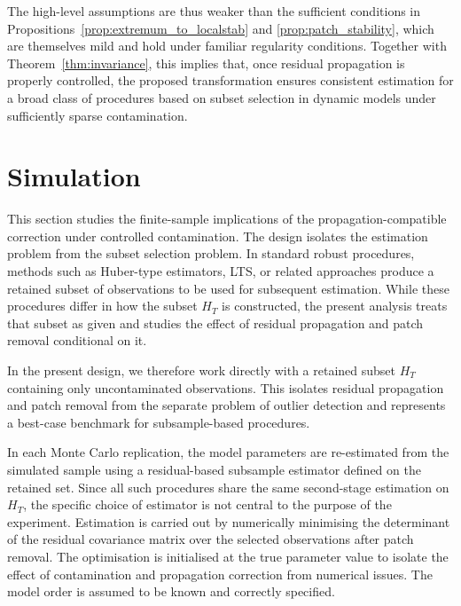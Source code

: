 \documentclass[12pt]{article}
\numberwithin{equation}{section}
\begin{document}
The high-level assumptions are thus weaker than the sufficient conditions in Propositions~\ref{prop:extremum_to_localstab} and \ref{prop:patch_stability}, which are themselves mild and hold under familiar regularity conditions. 
Together with Theorem~\ref{thm:invariance}, this implies that, once residual propagation is properly controlled, the proposed transformation ensures consistent estimation for a broad class of procedures based on subset selection in dynamic models under sufficiently sparse contamination.


\section{Simulation}\label{sec:simulation}

This section studies the finite-sample implications of the propagation-compatible correction under controlled contamination. 
The design isolates the estimation problem from the subset selection problem. 
In standard robust procedures, methods such as Huber-type estimators, LTS, or related approaches produce a retained subset of observations to be used for subsequent estimation. 
While these procedures differ in how the subset $H_T$ is constructed, the present analysis treats that subset as given and studies the effect of residual propagation and patch removal conditional on it.

In the present design, we therefore work directly with a retained subset $H_T$ containing only uncontaminated observations. 
This isolates residual propagation and patch removal from the separate problem of outlier detection and represents a best-case benchmark for subsample-based procedures.

In each Monte Carlo replication, the model parameters are re-estimated from the simulated sample using a residual-based subsample estimator defined on the retained set. 
Since all such procedures share the same second-stage estimation on $H_T$, the specific choice of estimator is not central to the purpose of the experiment.
Estimation is carried out by numerically minimising the determinant of the residual covariance matrix over the selected observations after patch removal. 
The optimisation is initialised at the true parameter value to isolate the effect of contamination and propagation correction from numerical issues. 
The model order is assumed to be known and correctly specified.
\end{document}
